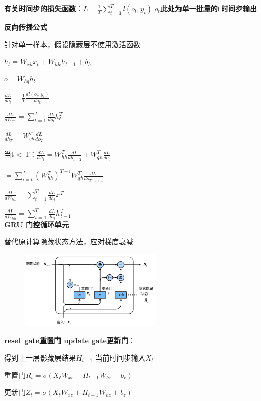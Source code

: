 \documentclass[UTF8]{ctexart}
\begin{document}
  \textbf{有关时间步的损失函数}：$L = \frac{1}{T}\sum_{t = 1}^{T} l(o_t, y_t) $ \textbf{$o_t$此处为单一批量的t时间步输出}

  \textbf{反向传播公式} 
  
  \quad 针对单一样本，假设隐藏层不使用激活函数

  \quad \quad $h_t = W_{xh}x_t + W_{hh}h_{t-1} + b_h$

  \quad \quad $o = W_{hq}h_t$
  
  \quad $\frac{d L}{d o_t} = \frac{1}{T}\frac{d l(o_t, y_t)}{d o_t}$
  
  \quad $\frac{d L}{d W_{qh}} = \sum_{t=1}^{T}\frac{d L}{d o_t}h_t^T$
  
  \quad $\frac{d L}{d h_T} = W_{qh}^T\frac{d L}{d o_T}$
  
  \quad 当t < T：$\frac{d L}{d h_t} = W_{hh}^T\frac{d L}{d h_{t+1}} + W_{qh}^T\frac{d L}{d o_t}$
  
  \quad \quad $ = \sum_{i=t}^{T}(W_{hh}^T)^{T - i}W_{qh}^T\frac{d L}{d o_{T - i + t}}$
  
  \quad $\frac{d L}{d W_{hx}} = \sum_{t=1}^{T}\frac{d L}{d h_t}x^T$
  
  \quad $\frac{d L}{d W_{hh}} = \sum_{t=1}^{T}\frac{d L}{d h_t}h_{t-1}^T$\\
\textbf{GRU 门控循环单元}

  替代原计算隐藏状态方法，应对梯度衰减
  \begin{figure}[H] %
    \centering %
    \includegraphics[width=0.6\textwidth]{note_images/GRU.png} %
  \end{figure}

  \textbf{reset gate重置门 update gate更新门}：

  \quad 得到上一层影藏层结果$H_{t-1}$ 当前时间步输入$X_t$

  \quad 重置门$R_t = \sigma(X_tW_{xr} + H_{t-1}W_{hr} + b_r)$
  
  \quad 更新门$Z_t = \sigma(X_tW_{xz} + H_{t-1}W_{hz} + b_z)$
\end{document}
